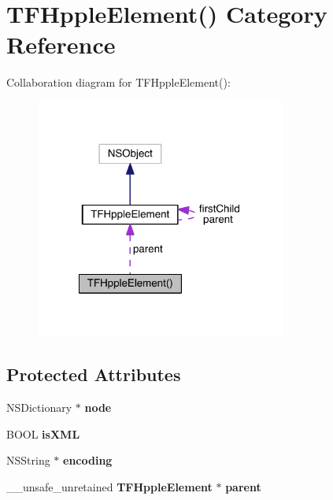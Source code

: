\section{T\+F\+Hpple\+Element() Category Reference}
\label{category_t_f_hpple_element_07_08}


Collaboration diagram for T\+F\+Hpple\+Element()\+:
\nopagebreak
\begin{figure}[H]
\begin{center}
\leavevmode
\includegraphics[width=233pt]{category_t_f_hpple_element_07_08__coll__graph}
\end{center}
\end{figure}
\subsection*{Protected Attributes}
\begin{DoxyCompactItemize}
\item 
N\+S\+Dictionary $\ast$ {\bfseries node}\label{category_t_f_hpple_element_07_08_a3742b005d3fd31acacff0d1573cb8a89}

\item 
B\+O\+O\+L {\bfseries is\+X\+M\+L}\label{category_t_f_hpple_element_07_08_a41941751fd0f1fdf6c18c0f90c5991cb}

\item 
N\+S\+String $\ast$ {\bfseries encoding}\label{category_t_f_hpple_element_07_08_a0a7ccc47e17245385fbaf177baad31bf}

\item 
\+\_\+\+\_\+unsafe\+\_\+unretained {\bf T\+F\+Hpple\+Element} $\ast$ {\bfseries parent}\label{category_t_f_hpple_element_07_08_ac7602bad8a05294a6beecabe01e6e569}

\end{DoxyCompactItemize}
